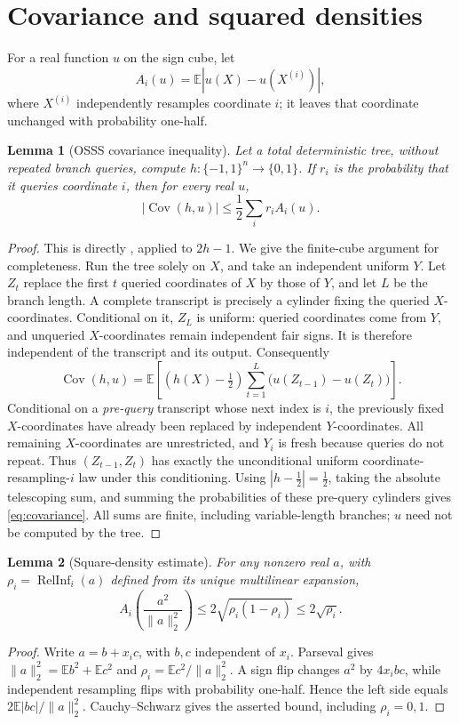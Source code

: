 \documentclass[11pt]{article}
\newtheorem{lemma}{Lemma}
\newcommand{\E}{\mathbb E}
\newcommand{\Cov}{\operatorname{Cov}}
\newcommand{\RelInf}{\operatorname{RelInf}}
\begin{document}
\section{Covariance and squared densities}
For a real function \(u\) on the sign cube, let
\[
 A_i(u)=\E|u(X)-u(X^{(i)})|,
\]
where \(X^{(i)}\) independently resamples coordinate \(i\);
it leaves that coordinate unchanged with probability one-half.

\begin{lemma}[OSSS covariance inequality]\label{lem:covariance}
Let a total deterministic tree, without repeated branch queries,
compute \(h:\{-1,1\}^n\to\{0,1\}\).
If \(r_i\) is the probability that it queries coordinate \(i\), then
for every real \(u\),
\begin{equation}\label{eq:covariance}
 |\Cov(h,u)|\le\frac12\sum_i r_i A_i(u).
\end{equation}
\end{lemma}
\begin{proof}
This is directly \cite[\S3.3, Eq.~(6)]{OSSS}, applied to \(2h-1\).
We give the finite-cube argument for completeness.
Run the tree solely on \(X\), and take an independent uniform \(Y\).
Let \(Z_t\) replace the first \(t\) queried coordinates of \(X\) by
those of \(Y\), and let \(L\) be the branch length.
A complete transcript is precisely a cylinder fixing the queried
\(X\)-coordinates. Conditional on it, \(Z_L\) is uniform:
queried coordinates come from \(Y\), and unqueried \(X\)-coordinates
remain independent fair signs. It is therefore independent of the
transcript and its output. Consequently
\[
 \Cov(h,u)=\E\left[(h(X)-\tfrac12)
             \sum_{t=1}^L\big(u(Z_{t-1})-u(Z_t)\big)\right].
\]
Conditional on a \emph{pre-query} transcript whose next index is \(i\),
the previously fixed \(X\)-coordinates have already been replaced
by independent \(Y\)-coordinates. All remaining \(X\)-coordinates
are unrestricted, and \(Y_i\) is fresh because queries do not repeat.
Thus \((Z_{t-1},Z_t)\) has exactly the unconditional uniform
coordinate-resampling-\(i\) law under this conditioning.
Using \(|h-\tfrac12|=\tfrac12\), taking the absolute telescoping sum,
and summing the probabilities of these pre-query cylinders gives
\eqref{eq:covariance}. All sums are finite, including variable-length
branches; \(u\) need not be computed by the tree.
\end{proof}

\begin{lemma}[Square-density estimate]\label{lem:square}
For any nonzero real \(a\), with
\(\rho_i=\RelInf_i(a)\) defined from its unique multilinear expansion,
\[
 A_i\!\left(\frac{a^2}{\|a\|_2^2}\right)
 \le2\sqrt{\rho_i(1-\rho_i)}\le2\sqrt{\rho_i}.
\]
\end{lemma}
\begin{proof}
Write \(a=b+x_ic\), with \(b,c\) independent of \(x_i\).
Parseval gives \(\|a\|_2^2=\E b^2+\E c^2\) and
\(\rho_i=\E c^2/\|a\|_2^2\).
A sign flip changes \(a^2\) by \(4x_ibc\), while independent resampling
flips with probability one-half. Hence the left side equals
\(2\E|bc|/\|a\|_2^2\).
Cauchy--Schwarz gives the asserted bound, including \(\rho_i=0,1\).
\end{proof}
\end{document}
